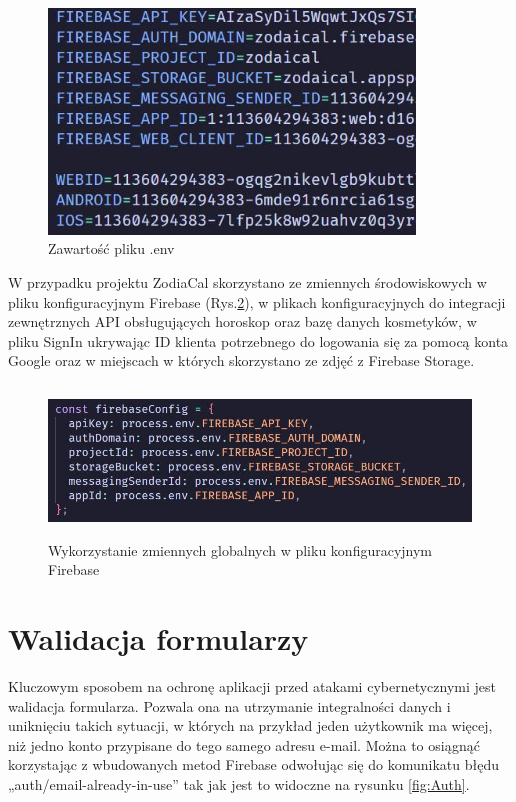 \begin{figure}[ht]
	\centering
	\vspace{0.25cm}
	\includegraphics[height=6cm]{images/bezpieczenstwo/env}
	\caption{Zawartość pliku .env}
	\label{fig:Env}
\end{figure}

\newpage
W przypadku projektu ZodiaCal skorzystano ze zmiennych środowiskowych w pliku konfiguracyjnym Firebase (Rys.\ref{fig:FirebaseConfig}), w plikach konfiguracyjnych do integracji zewnętrznych API obsługujących horoskop oraz bazę danych kosmetyków, w pliku SignIn ukrywając ID klienta potrzebnego do logowania się za pomocą konta Google oraz w miejscach w których skorzystano ze zdjęć z Firebase Storage.

\begin{figure}[ht]
	\centering
	\vspace{0.25cm}
	\includegraphics[height=4cm]{images/bezpieczenstwo/firebaseConfig}
	\caption{Wykorzystanie zmiennych globalnych w pliku konfiguracyjnym Firebase}
	\label{fig:FirebaseConfig}
\end{figure}

\section*{Walidacja formularzy}
Kluczowym sposobem na ochronę aplikacji przed atakami cybernetycznymi jest walidacja formularza. Pozwala ona na utrzymanie integralności danych i uniknięciu takich sytuacji, w których na przykład jeden użytkownik ma więcej, niż jedno konto przypisane do tego samego adresu e-mail. Można to osiągnąć korzystając z wbudowanych metod Firebase odwołując się do komunikatu błędu „auth/email-already-in-use” tak jak jest to widoczne na rysunku \ref{fig:Auth}.

